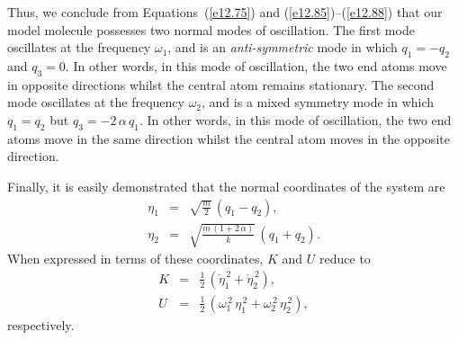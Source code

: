 Thus, we conclude from Equations~(\ref{e12.75}) and (\ref{e12.85})--(\ref{e12.88}) that our model molecule possesses two normal modes of oscillation. The first mode oscillates at the frequency $\omega_1$, and
is an {\em anti-symmetric}\/ mode in which $q_1=-q_2$ and $q_3=0$. 
In other words, in this mode of oscillation, the two end atoms move in opposite
directions whilst the central atom remains stationary. The second mode oscillates at the frequency $\omega_2$, and is a mixed symmetry mode in which
 $q_1=q_2$ but $q_3=-2\,\alpha\,q_1$. In other words, in this mode of oscillation,  the
 two end atoms move in the same direction whilst the central atom moves
 in the opposite direction.
 
 Finally, it is easily demonstrated that the normal coordinates of the system
 are 
 \begin{eqnarray}
 \eta_1 &=& \sqrt{\frac{m}{2}}\,(q_1-q_2),\\[0.5ex]
 \eta_2 &=& \sqrt{\frac{m\,(1+2\,\alpha)}{k}}\,(q_1+q_2).
 \end{eqnarray}
 When expressed in terms of these coordinates, $K$ and $U$ reduce to
 \begin{eqnarray}
K &=& \frac{1}{2}\,(\dot{\eta}_1^{\,2} + \dot{\eta}_2^{\,2}),\\[0.5ex]
U &=&\frac{1}{2}\,(\omega_1^{\,2}\,\eta_1^{\,2} + \omega_2^{\,2}\,\eta_2^{\,2}),
\end{eqnarray}
respectively.

